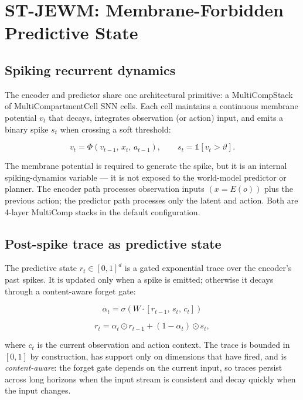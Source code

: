 \documentclass{article}
\begin{document}
\section{ST-JEWM: Membrane-Forbidden Predictive State}

\subsection{Spiking recurrent dynamics}

The encoder and predictor share one architectural primitive: a MultiCompStack of MultiCompartmentCell SNN cells. Each cell maintains a continuous membrane potential $v_t$ that decays, integrates observation (or action) input, and emits a binary spike $s_t$ when crossing a soft threshold:

\begin{equation}
v_t = \Phi(v_{t-1},\, x_t,\, a_{t-1}), \qquad s_t = \mathbb{1}[v_t > \vartheta].
\end{equation}

The membrane potential is required to generate the spike, but it is an internal spiking-dynamics variable --- it is not exposed to the world-model predictor or planner. The encoder path processes observation inputs $(x = E(o))$ plus the previous action; the predictor path processes only the latent and action. Both are 4-layer MultiComp stacks in the default configuration.

\subsection{Post-spike trace as predictive state}

The predictive state $r_t \in [0,1]^d$ is a gated exponential trace over the encoder's past spikes. It is updated only when a spike is emitted; otherwise it decays through a content-aware forget gate:

\begin{equation}
\alpha_t = \sigma\!\left(W \cdot [r_{t-1},\, s_t,\, c_t]\right)
\end{equation}

\begin{equation}
r_t = \alpha_t \odot r_{t-1} + (1-\alpha_t) \odot s_t,
\end{equation}

where $c_t$ is the current observation and action context. The trace is bounded in $[0,1]$ by construction, has support only on dimensions that have fired, and is \emph{content-aware}: the forget gate depends on the current input, so traces persist across long horizons when the input stream is consistent and decay quickly when the input changes.
\end{document}
